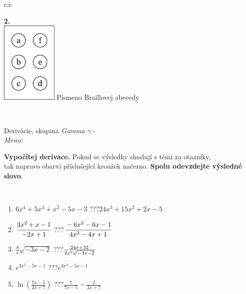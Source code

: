 \documentclass[10pt]{report}
\begin{document}
\begin{tabular}{c:c}
\begin{minipage}[c][104.5mm][t]{0.5\linewidth}
\begin{center}
\begin{minipage}{0.20\linewidth}
\begin{center}
{\Huge\bfseries 2.} \\[2mm]
\includegraphics[height=40mm]{../images/braille.png}
{\small Písmeno Braillovej abecedy}
\end{center}
\end{minipage}
\end{center}
\end{minipage}
\\ \hdashline
\begin{minipage}[c][104.5mm][t]{0.5\linewidth}
\begin{center}
\vspace{7mm}
{\huge Derivácie, skupina \textit{Gamma $\gamma$} -}\\[5mm]
\textit{Meno:}\phantom{xxxxxxxxxxxxxxxxxxxxxxxxxxxxxxxxxxxxxxxxxxxxxxxxxxxxxxxxxxxxxxxxx}\\[5mm]
\begin{minipage}{0.95\linewidth}
\begin{center}
\textbf{Vypočítej derivace.} Pokud se výsledky shodují s těmi za otazníky,\\tak napravo obarvi příslušející kroužek načerno. \textbf{Spolu odevzdejte výsledné slovo}.
\end{center}
\end{minipage}
\\[1mm]
\begin{minipage}{0.79\linewidth}
\begin{center}
\begin{varwidth}{\linewidth}
\begin{enumerate}
\normalsize
\item $6x^4+5x^3+x^2-5x-3$\quad \dotfill\; ???\;\dotfill \quad $24x^3+15x^2+2x-5$
\item $\cfrac{3x^2+x-1}{-2x+1}$\quad \dotfill\; ???\;\dotfill \quad $\cfrac{-6x^2-6x-1}{4x^2-4x+1}$
\item $\frac{8}{x}\sqrt{-3x-2}$\quad \dotfill\; ???\;\dotfill \quad $\frac{24x+32}{2x^2 \sqrt{\smash[b]{-3x-2}}}$
\item $e^{3x^2-5x-1}$\quad \dotfill\; ???\;\dotfill \quad $e^{3x^2-5x-1}$
\item $\ln{\left(\frac{7x-5}{2x+7}\right)}$\quad \dotfill\; ???\;\dotfill \quad $\frac{7}{7x-5}-\frac{2}{2x+7}$

\end{enumerate}
\end{varwidth}
\end{center}
\end{minipage}
\end{center}
\end{minipage}
\end{tabular}
\end{document}
